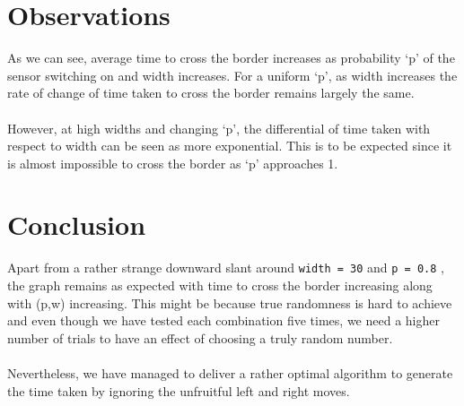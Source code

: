 \documentclass{article}
\let\oldtexttt\texttt
\renewcommand{\texttt}[1]{
  \colorbox{bgcolor}{\oldtexttt{#1}}
  }
\begin{document}

\section{Observations}

As we can see, average time to cross the border increases as probability `p' of the sensor switching on and width increases. For a uniform `p', as width increases the rate of change of time taken to cross the border remains largely the same. 
\\\\However, at high widths and changing `p', the differential of time taken with respect to width can be seen as more exponential. This is to be expected since it is almost impossible to cross the border as `p' approaches 1. 

\section{Conclusion}

Apart from a rather strange downward slant around \texttt{width = 30} and \texttt{p = 0.8}, the graph remains as expected with time to cross the border increasing along with (p,w) increasing. This might be because true randomness is hard to achieve and even though we have tested each combination five times, we need a higher number of trials to have an effect of choosing a truly random number. 
\\\\Nevertheless, we have managed to deliver a rather optimal algorithm to generate the time taken by ignoring the unfruitful left and right moves.
\end{document}
